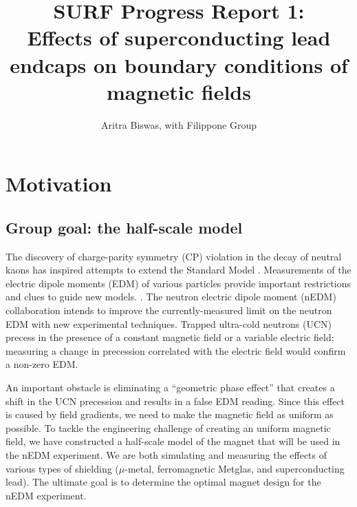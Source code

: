 \documentclass[twocolumn,aps,prb,citeautoscript]{revtex4-1}
\begin{document}
\title{SURF Progress Report 1:\\
Effects of superconducting lead endcaps on boundary conditions of
magnetic fields}
\author{Aritra Biswas, with Filippone Group}



\maketitle

\section{Motivation}

\subsection{Group goal: the half-scale model}

The discovery of charge-parity symmetry (CP) violation 
in the decay of neutral kaons has inspired attempts to extend the
Standard Model \cite{cpv}. Measurements of the electric
dipole moments (EDM) of various particles provide important restrictions
and clues to guide new models. \cite{ill}.
The neutron electric dipole moment (nEDM) collaboration intends to
improve \cite{krl} the currently-measured limit \cite{ill}
on the neutron EDM with new experimental techniques.
Trapped ultra-cold neutrons (UCN) precess in the presence
of a constant magnetic field or a variable electric field; measuring
a change in precession correlated with the electric field
would confirm a non-zero EDM.

An important obstacle is eliminating a ``geometric phase effect''
that creates a shift in the UCN precession and results in
a false EDM reading. Since this effect is caused by field gradients,
we need to make the magnetic field as uniform as possible.
To 
tackle the engineering challenge of creating an uniform magnetic field,
we have constructed a half-scale model of the magnet that will be
used in the nEDM experiment. We are both simulating and measuring
the effects of various types of shielding ($\mu$-metal,
ferromagnetic Metglas, and superconducting lead). The ultimate goal is to
determine the optimal magnet design for the nEDM experiment.
\end{document}
